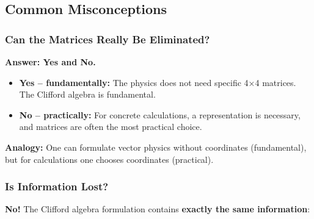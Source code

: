 \subsection{Common Misconceptions}
\label{subsec:common_misconceptions}

\subsubsection{Can the Matrices Really Be Eliminated?}

\textbf{Answer: Yes and No.}

\begin{itemize}
	\item \textbf{Yes – fundamentally:} The physics does not need specific 4×4 matrices. The Clifford algebra is fundamental.
	
	\item \textbf{No – practically:} For concrete calculations, a representation is necessary, and matrices are often the most practical choice.
\end{itemize}

\textbf{Analogy:} One can formulate vector physics without coordinates (fundamental), but for calculations one chooses coordinates (practical).

\subsubsection{Is Information Lost?}

\textbf{No!} The Clifford algebra formulation contains \textbf{exactly the same information}:

\begin{table}[h]
	\centering
	\caption{Information identical in both formulations}
\end{table}

